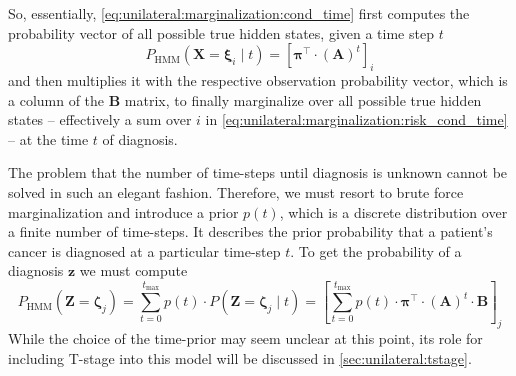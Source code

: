 \documentclass[\relativeRoot/main.tex]{subfiles}
\begin{document}
So, essentially, \cref{eq:unilateral:marginalization:cond_time} first computes the probability vector of all possible true hidden states, given a time step $t$
%
\begin{equation} \label{eq:unilateral:marginalization:risk_cond_time}
    P_\text{HMM} \left( \mathbf{X} = \boldsymbol{\xi}_i \mid t \right) = \left[ \boldsymbol{\pi}^\top \cdot (\mathbf{A})^t \right]_i
\end{equation}
%
and then multiplies it with the respective observation probability vector, which is a column of the $\mathbf{B}$ matrix, to finally marginalize over all possible true hidden states -- effectively a sum over $i$ in \cref{eq:unilateral:marginalization:risk_cond_time} -- at the time $t$ of diagnosis.

The problem that the number of time-steps until diagnosis is unknown cannot be solved in such an elegant fashion. Therefore, we must resort to brute force marginalization and introduce a prior $p(t)$, which is a discrete distribution over a finite number of time-steps. It describes the prior probability that a patient's cancer is diagnosed at a particular time-step $t$. To get the probability of a diagnosis $\mathbf{z}$ we must compute
%
\begin{equation} \label{eq:unilateral:hmm_marginalize}
    P_\text{HMM} \left( \mathbf{Z} = \boldsymbol{\zeta}_j \right) = \sum_{t = 0}^{t_\text{max}}{p(t) \cdot P\left( \mathbf{Z} = \boldsymbol{\zeta}_j \mid t \right)} = \left[ \sum_{t = 0}^{t_\text{max}}{p(t) \cdot \boldsymbol{\pi}^\top \cdot (\mathbf{A})^t \cdot \mathbf{B}} \right]_j
\end{equation}
%
While the choice of the time-prior may seem unclear at this point, its role for including T-stage into this model will be discussed in \cref{sec:unilateral:tstage}.
\end{document}
